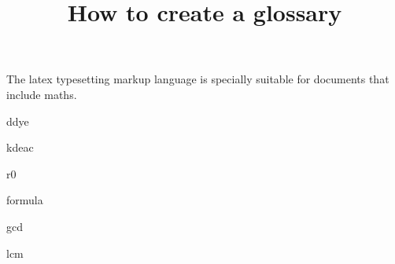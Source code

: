\documentclass{article}
\title{How to create a glossary}
\author{ }
\date{ }
\begin{document}
\maketitle

The \Gls{latex} typesetting markup language is specially suitable
for documents that include \gls{maths}.

\clearpage

\gls{ddye}

\gls{kdeac}

\gls{r0}

\gls{formula}

\gls{gcd}

\gls{lcm}


\printglossaries
\end{document}
